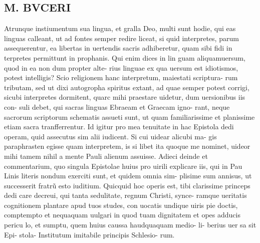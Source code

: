 \documentclass{article}
\begin{document}
\begin{pages}
\section*{M. BVCERI }\pstart Atrunque instiumentum sua lingua, et gralla Deo, multi sunt hodie, qui eas linguas calleant, ut ad fontes semper redire liceat, si quid interpretes, parum assequerentur, ea libertas in uertendis sacris adhiberetur, quam sibi fidi in terpretes permittunt in prophanis. Qui enim dices in lin guam aliquamuersum, quod in ea non dum propter alte- rius linguae ex qua uersum est idiotismos, potest intelligis? Scio religionem hanc interpretum, maiestati scriptura- rum tributam, sed ut dixi autogropha spiritus extant, ad quae semper potest corrigi, sicubi interpretes dormitent, quarc mihi praestare uidetur, dum uersionibus iis con- suli debet, qui sacras linguas Ebraeam et Graecam igno- rant, neque sacrorum scriptorum schematis assueti sunt, ut quam familiarissime et planissime etiam sacra tranfferrentur. Id igitur pro mea tenuitate in hac Epistola dedi operam, quid assecutus sim alii iudicent. Si cui uidear alicubi ma- gis paraphrasten egisse quam interpretem, is si libet ita quoque me nominet, uideor mihi tamem nihil a mente Pauli alienum assuisse. Adieci deinde et commentarium, quo singula Epistolae huius pro uirili explicare iis, qui in Pau Linis literis nondum exerciti sunt, et quidem omnia sim- plisime sum annisus, ut successerit fratrũ esto iuditium.   \pend\pstart Quicquid hoc operis est, tibi clarissime princeps dedi care decreui, qui tanta sedulitate, regnum Christi, synce- ramque ueritatis cognitionem plantare apud tuos studes, con uocatis undique uiris pie doctis, comptempto et nequaquam uulgari in quod tuam dignitatem et opes adducis pericu lo, et sumptu, quem huius caussa haudquaquam medio-  \pendQuare li- berius uer sa sit Epi- stola- Institutum imitabile principis Schlesio- rum.  

\end{pages}
\end{document}
